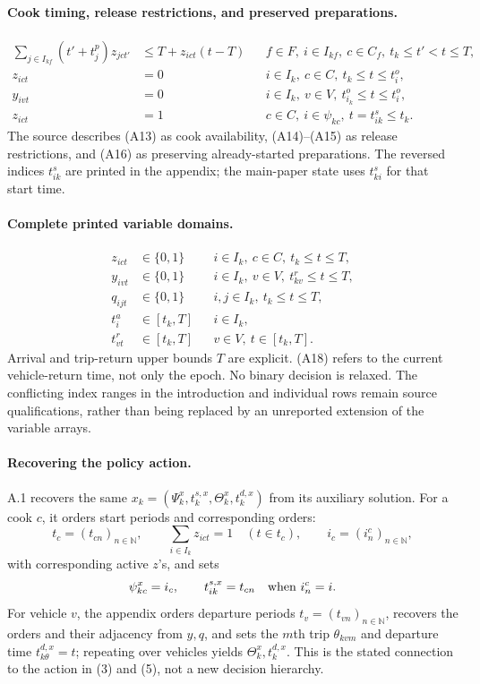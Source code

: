 \documentclass{article}
\begin{document}
\paragraph{Cook timing, release restrictions, and preserved preparations.}
\begin{align}
\sum_{j\in I_{kf}}(t'+t_j^p)z_{jct'}
 &\leq T+z_{ict}(t-T)
 &&f\in F,\ i\in I_{kf},\ c\in C_f,\ t_k\leq t'<t\leq T, \tag{A13}\\
z_{ict}&=0
 &&i\in I_k,\ c\in C,\ t_k\leq t\leq t_i^o, \tag{A14}\\
y_{ivt}&=0
 &&i\in I_k,\ v\in V,\ t_{i_k}^o\leq t\leq t_i^o, \tag{A15}\\
z_{ict}&=1
 &&c\in C,\ i\in\psi_{kc},\ t=t_{ik}^s\leq t_k. \tag{A16}
\end{align}
The source describes (A13) as cook availability, (A14)--(A15) as release restrictions, and (A16) as preserving already-started preparations. The reversed indices \(t_{ik}^s\) are printed in the appendix; the main-paper state uses \(t_{ki}^s\) for that start time.

\paragraph{Complete printed variable domains.}
\begin{align}
z_{ict}&\in\{0,1\}
 &&i\in I_k,\ c\in C,\ t_k\leq t\leq T, \tag{A17}\\
y_{ivt}&\in\{0,1\}
 &&i\in I_k,\ v\in V,\ t_{kv}^r\leq t\leq T, \tag{A18}\\
q_{ijt}&\in\{0,1\}
 &&i,j\in I_k,\ t_k\leq t\leq T, \tag{A19}\\
t_i^a&\in[t_k,T]
 &&i\in I_k, \tag{A20}\\
t_{vt}^r&\in[t_k,T]
 &&v\in V,\ t\in[t_k,T]. \tag{A21}
\end{align}
Arrival and trip-return upper bounds \(T\) are explicit. (A18) refers to the current vehicle-return time, not only the epoch. No binary decision is relaxed. The conflicting index ranges in the introduction and individual rows remain source qualifications, rather than being replaced by an unreported extension of the variable arrays.

\paragraph{Recovering the policy action.}
A.1 recovers the same \(x_k=(\Psi_k^x,t_k^{s,x},\Theta_k^x,t_k^{d,x})\) from its auxiliary solution. For a cook \(c\), it orders start periods and corresponding orders:
\[
t_c=(t_{cn})_{n\in\mathbb N},\qquad
\sum_{i\in I_k}z_{ict}=1\quad(t\in t_c),\qquad
i_c=(i_n^c)_{n\in\mathbb N},
\]
with corresponding active \(z\)'s, and sets
\[
\psi_{kc}^x=i_c,\qquad
t_{ik}^{s,x}=t_{cn}\quad\hbox{when }i_n^c=i.
\]
For vehicle \(v\), the appendix orders departure periods \(t_v=(t_{vn})_{n\in\mathbb N}\), recovers the orders and their adjacency from \(y,q\), and sets the \(m\)th trip \(\theta_{kvm}\) and departure time \(t_{k\theta}^{d,x}=t\); repeating over vehicles yields \(\Theta_k^x,t_k^{d,x}\). This is the stated connection to the action in (3) and (5), not a new decision hierarchy.
\end{document}
